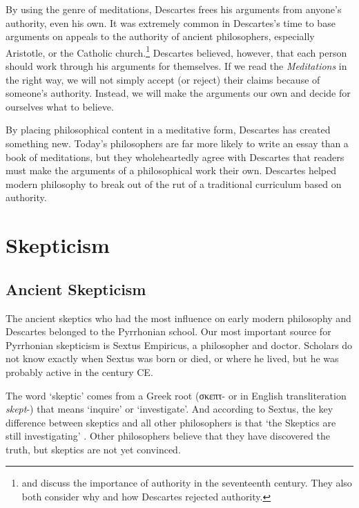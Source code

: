 By using the genre of meditations, Descartes frees his arguments from anyone's authority, even his own. It was extremely common in Descartes's time to base arguments on appeals to the authority of ancient philosophers, especially Aristotle, or the Catholic church.\footnote{\citet[4--7]{cottingham1986} and \citet[4--5]{garber1998} discuss the importance of authority in the seventeenth century. They also both consider why and how Descartes rejected authority.} Descartes believed, however, that each person should work through his arguments for themselves. If we read the \textit{Meditations} in the right way, we will not simply accept (or reject) their claims because of someone's authority. Instead, we will make the arguments our own and decide for ourselves what to believe.

By placing philosophical content in a meditative form, Descartes has created something new. Today's philosophers are far more likely to write an essay than a book of meditations, but they wholeheartedly agree with Descartes that readers must make the arguments of a philosophical work their own. Descartes helped modern philosophy to break out of the rut of a traditional curriculum based on authority.

\section*{Skepticism}

\subsection*{Ancient Skepticism}

The ancient skeptics who had the most influence on early modern philosophy and Descartes belonged to the Pyrrhonian school. Our most important source for Pyrrhonian skepticism is Sextus Empiricus, a philosopher and doctor. Scholars do not know exactly when Sextus was born or died, or where he lived, but he was probably active in the  century CE.

The word `skeptic' comes from a Greek root (\textgreek{σκεπτ}- or in English transliteration \textit{skept}-) that means `inquire' or `investigate'. And according to Sextus, the key difference between skeptics and all other philosophers is that `the Skeptics are still investigating' \citep[I i 3]{annasbarnes1994}. Other philosophers believe that they have discovered the truth, but skeptics are not yet convinced.

